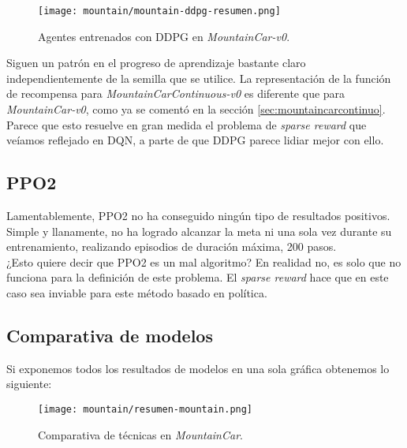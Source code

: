 \documentclass[11pt,fleqn]{book} %
\begin{document}
\begin{figure}[H]
	\centering\texttt{[image: mountain/mountain-ddpg-resumen.png]}
	\caption{Agentes entrenados con DDPG en \textit{MountainCar-v0}.}
	\label{fig:mountainDDPGresumen} %
\end{figure}

Siguen un patrón en el progreso de aprendizaje bastante claro independientemente de la semilla que se utilice. La representación de la función de recompensa para \textit{MountainCarContinuous-v0} es diferente que para \textit{MountainCar-v0}, como ya se comentó en la sección \ref{sec:mountaincarcontinuo}. Parece que esto resuelve en gran medida el problema de \textit{sparse reward} que veíamos reflejado en DQN, a parte de que DDPG parece lidiar mejor con ello.  

\subsection{PPO2}

Lamentablemente, PPO2 no ha conseguido ningún tipo de resultados positivos. Simple y llanamente, no ha logrado alcanzar la meta ni una sola vez durante su entrenamiento, realizando episodios de duración máxima, 200 pasos. \\

¿Esto quiere decir que PPO2 es un mal algoritmo? En realidad no, es solo que no funciona para la definición de este problema. El \textit{sparse reward} hace que en este caso sea inviable para este método basado en política. \\

\subsection{Comparativa de modelos}

Si exponemos todos los resultados de modelos en una sola gráfica obtenemos lo siguiente:

\begin{figure}[H]
	\centering\texttt{[image: mountain/resumen-mountain.png]}
	\caption{Comparativa de técnicas en \textit{MountainCar}.}
	\label{fig:mountainresumen} %
\end{figure}
\end{document}
